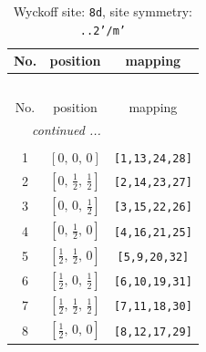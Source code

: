 \documentclass[fleqn,8pt]{jsarticle}
\begin{document}
\begin{longtable}{ccc}
\caption{Wyckoff site: {\tt 8d}, site symmetry: {\tt ..2'/m'}}
 \\
 \hline \hline
No. & position & mapping \\ \hline \endfirsthead

\multicolumn{2}{l}{\tablename\ \thetable{}} \\
 \hline \hline
No. & position & mapping \\ \hline \endhead

 \hline \hline
\multicolumn{2}{r}{\footnotesize\it continued ...} \\ \endfoot

 \hline \hline
\multicolumn{2}{r}{} \\ \endlastfoot

1 & $\left[ 0,\, 0,\, 0 \right]$ & {\tt [1,13,24,28]} \\ \hline
2 & $\left[ 0,\, \frac{1}{2},\, \frac{1}{2} \right]$ & {\tt [2,14,23,27]} \\ \hline
3 & $\left[ 0,\, 0,\, \frac{1}{2} \right]$ & {\tt [3,15,22,26]} \\ \hline
4 & $\left[ 0,\, \frac{1}{2},\, 0 \right]$ & {\tt [4,16,21,25]} \\ \hline
5 & $\left[ \frac{1}{2},\, \frac{1}{2},\, 0 \right]$ & {\tt [5,9,20,32]} \\ \hline
6 & $\left[ \frac{1}{2},\, 0,\, \frac{1}{2} \right]$ & {\tt [6,10,19,31]} \\ \hline
7 & $\left[ \frac{1}{2},\, \frac{1}{2},\, \frac{1}{2} \right]$ & {\tt [7,11,18,30]} \\ \hline
8 & $\left[ \frac{1}{2},\, 0,\, 0 \right]$ & {\tt [8,12,17,29]} \\
\end{longtable}
\renewcommand{\arraystretch}{1.2}
\end{document}
